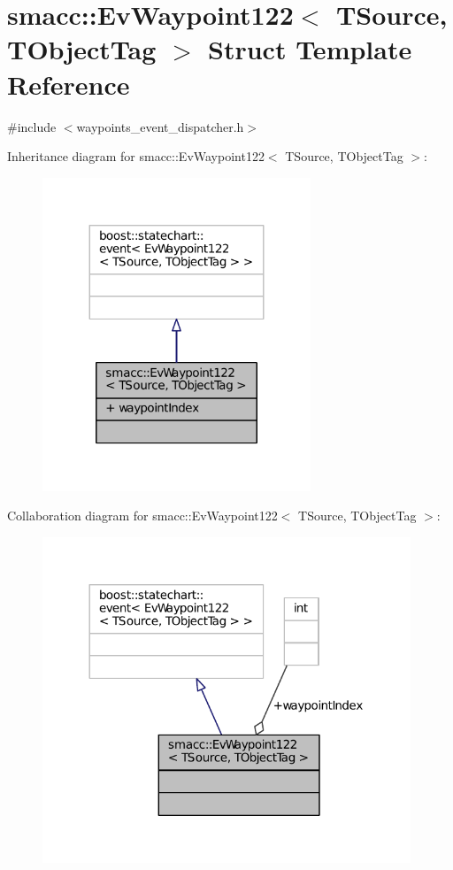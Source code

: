\hypertarget{structsmacc_1_1EvWaypoint122}{}\section{smacc\+:\+:Ev\+Waypoint122$<$ T\+Source, T\+Object\+Tag $>$ Struct Template Reference}
\label{structsmacc_1_1EvWaypoint122}


{\ttfamily \#include $<$waypoints\+\_\+event\+\_\+dispatcher.\+h$>$}



Inheritance diagram for smacc\+:\+:Ev\+Waypoint122$<$ T\+Source, T\+Object\+Tag $>$\+:
\nopagebreak
\begin{figure}[H]
\begin{center}
\leavevmode
\includegraphics[width=227pt]{structsmacc_1_1EvWaypoint122__inherit__graph}
\end{center}
\end{figure}


Collaboration diagram for smacc\+:\+:Ev\+Waypoint122$<$ T\+Source, T\+Object\+Tag $>$\+:
\nopagebreak
\begin{figure}[H]
\begin{center}
\leavevmode
\includegraphics[width=312pt]{structsmacc_1_1EvWaypoint122__coll__graph}
\end{center}
\end{figure}
